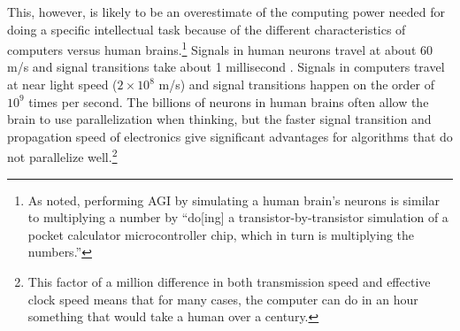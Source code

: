 \documentclass[letterpaper,twocolumn]{article}
\begin{document}
This, however, is likely to be an overestimate of the computing power
needed for doing a specific intellectual task because of the different
characteristics of computers versus human brains.\footnote{As
\cite{byrneshardwarerequirements} noted, performing AGI by simulating
a human brain's neurons is similar to multiplying a number by
``do[ing] a transistor-by-transistor simulation of a pocket calculator
microcontroller chip, which in turn is multiplying the numbers.''}
Signals in human neurons travel at about 60 m/s
\citep{nerveconductionmeasures} and signal transitions take about 1
millisecond
\citep[pg.~21]{principlesofneuralscience4th}.
Signals in computers travel at near light speed ($2 \times 10^8$ m/s) and signal
transitions happen on the order of $10^9$ times per second. The
billions of neurons in human brains often allow the brain to use
parallelization when thinking, but the faster signal transition and
propagation speed of electronics give significant advantages for
algorithms that do not parallelize well.\footnote{This factor of a
million difference in both transmission speed and effective clock
speed means that for many cases, the computer can do in an hour
something that would take a human over a century.}


\end{document}
